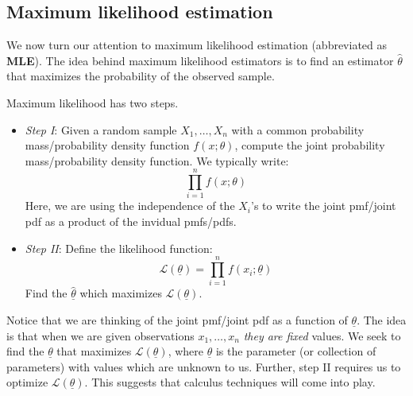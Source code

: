 \subsection{Maximum likelihood estimation}

We now turn our attention to maximum likelihood estimation (abbreviated as \textbf{MLE}). The idea behind maximum likelihood estimators is to find an estimator $\hat{\theta}$ that maximizes the probability of the observed sample.

Maximum likelihood has two steps.

\begin{itemize}
	\item \textit{Step I}: Given a random sample $X_1, \ldots, X_n$ with a common probability mass/probability density function $f(x;\theta)$, compute the joint probability mass/probability density function. We typically write:
	\[
			\prod_{i=1}^n f(x; \theta)
	\]
	Here, we are using the independence of the $X_i$'s to write the joint pmf/joint pdf as a product of the invidual pmfs/pdfs.

	\item \textit{Step II}: Define the likelihood function:
	\[
		\mathcal{L}(\underline{\theta}) = \prod_{i=1}^n f(x_i;\underline{\theta})
	\]
	Find the $\hat{\underline{\theta}}$ which maximizes $\mathcal{L}(\underline{\theta})$.
\end{itemize}

Notice that we are thinking of the joint pmf/joint pdf as a function of $\underline{\theta}$. The idea is that when we are given observations $x_1, \ldots, x_n$ \textit{they are fixed} values. We seek to find the $\underline{\theta}$ that maximizes $\mathcal{L}(\underline{\theta})$, where $\underline{\theta}$ is the parameter (or collection of parameters) with values which are unknown to us. Further, step II requires us to optimize $\mathcal{L}(\underline{\theta})$. This suggests that calculus techniques will come into play.


